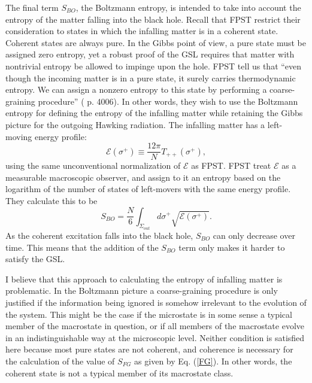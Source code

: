 \documentclass{article}
\begin{document}
The final term $S_{BO}$, the Boltzmann entropy, is intended to take into account the entropy of the matter falling into the black hole.  Recall that FPST restrict their consideration to states in which the infalling matter is in a coherent state.  Coherent states are always pure.  In the Gibbs point of view, a pure state must be assigned zero entropy, yet a robust proof of the GSL requires that matter with nontrivial entropy be allowed to impinge upon the hole.  FPST tell us that ``even though the incoming matter is in a pure state, it surely carries thermodynamic entropy.  We can assign a nonzero entropy to this state by performing a coarse-graining procedure'' (\cite{fiola94} p. 4006).  In other words, they wish to use the Boltzmann entropy for defining the entropy of the infalling matter while retaining the Gibbs picture for the outgoing Hawking radiation.  The infalling matter has a left-moving energy profile:
\begin{equation}
\mathcal{E}(\sigma^{+}) \equiv \frac{12\pi}{N} T_{++}(\sigma^{+}),
\end{equation}
using the same unconventional normalization of $\mathcal{E}$ as FPST.  FPST treat $\mathcal{E}$ as a measurable macroscopic observer, and assign to it an entropy based on the logarithm of the number of states of left-movers with the same energy profile.  They calculate this to be
\begin{equation}\label{BO}
S_{BO} = \frac{N}{6} \int_{\Sigma_{out}} d\sigma^{+} \sqrt{\mathcal{E}(\sigma^{+})}.
\end{equation}
As the coherent excitation falls into the black hole, $S_{BO}$ can only decrease over time.  This means that the addition of the $S_{BO}$ term only makes it harder to satisfy the GSL.

I believe that this approach to calculating the entropy of infalling matter is problematic.  In the Boltzmann picture a coarse-graining procedure is only justified if the information being ignored is somehow irrelevant to the evolution of the system.  This might be the case if the microstate is in some sense a typical member of the macrostate in question, or if all members of the macrostate evolve in an indistinguishable way at the microscopic level.  Neither condition is satisfied here because most pure states are not coherent, and coherence is necessary for the calculation of the value of $S_{FG}$ as given by Eq. (\ref{FG}).  In other words, the coherent state is not a typical member of its macrostate class.
\end{document}
